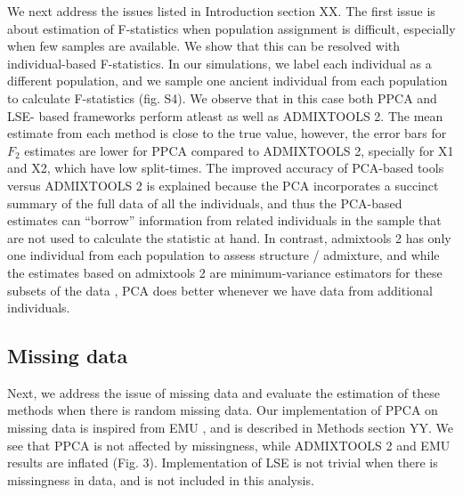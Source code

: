 \documentclass[12pt, letterpaper]{article}
\begin{document}
We next address the issues listed in Introduction section XX. The first issue is about estimation of F-statistics when population assignment is difficult, especially when few samples are available. We show that this can be resolved with individual-based F-statistics. In our simulations, we label each individual as a different population, and we sample one ancient individual from each population to calculate F-statistics (fig. S4). We observe that in this case both PPCA and LSE- based frameworks perform atleast as well as ADMIXTOOLS 2. The mean estimate from each method is close to the true value, however, the error bars for $F_2$ estimates are lower for PPCA compared to ADMIXTOOLS 2, specially for X1 and X2, which have low split-times. The improved accuracy of PCA-based tools versus ADMIXTOOLS 2 is explained because the PCA incorporates a succinct summary of the full data of all the individuals, and thus the PCA-based estimates can ``borrow'' information from related individuals in the sample that are not used to calculate the statistic at hand. In contrast, admixtools 2 has only one individual from each population to assess structure / admixture, and while the estimates based on admixtools 2 are minimum-variance estimators for these subsets of the data \citep{patterson_ancient_2012}, PCA does better whenever we have data from additional individuals.     

\subsection{Missing data}
Next, we address the issue of missing data and evaluate the estimation of these methods when there is random missing data. Our implementation of PPCA on missing data is inspired from EMU \cite{meisner_large-scale_2021}, and is described in Methods section YY. We see that PPCA is not affected by missingness, while ADMIXTOOLS 2 and EMU results are inflated (Fig. 3). Implementation of LSE is not trivial when there is missingness in data, and is not included in this analysis. 
\end{document}

